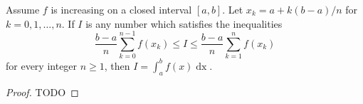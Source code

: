 \documentclass{report}
\begin{document}
\begin{theorem}{1.13}

  Assume $f$ is increasing on a closed interval $[a, b]$.
  Let $x_k = a + k(b - a) / n$ for $k = 0, 1, \ldots, n$.
  If $I$ is any number which satisfies the inequalities
    $$\frac{b - a}{n} \sum_{k=0}^{n-1} f(x_k)
      \leq I \leq
      \frac{b - a}{n} \sum_{k=1}^n f(x_k)$$
    for every integer $n \geq 1$, then $I = \int_a^b f(x) \mathop{dx}$.

\end{theorem}

\begin{proof}

  TODO

\end{proof}
\end{document}
